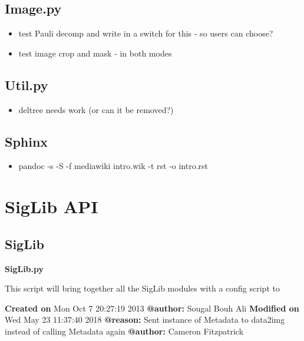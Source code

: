 \documentclass[letterpaper,10pt,english]{sphinxmanual}
\begin{document}
\section{Image.py}
\label{todo:image-py}\begin{itemize}
\item {} 
test Pauli decomp and write in a switch for this - so users can
choose?

\item {} 
test image crop and mask - in both modes

\end{itemize}


\section{Util.py}
\label{todo:util-py}\begin{itemize}
\item {} 
deltree needs work (or can it be removed?)

\end{itemize}


\section{Sphinx}
\label{todo:sphinx}\begin{itemize}
\item {} 
pandoc -s -S -f mediawiki intro.wik -t rst -o intro.rst

\end{itemize}


\chapter{SigLib API}
\label{code:siglib-api}\label{code::doc}

\section{SigLib}
\label{code:module-SigLib}\label{code:siglib}
\textbf{SigLib.py}

This script will bring together all the SigLib modules with a config script to

\textbf{Created on} Mon Oct  7 20:27:19 2013 \textbf{@author:} Sougal Bouh Ali
\textbf{Modified on} Wed May  23 11:37:40 2018 \textbf{@reason:} Sent instance of Metadata to data2img instead of calling Metadata again \textbf{@author:} Cameron Fitzpatrick
\end{document}
